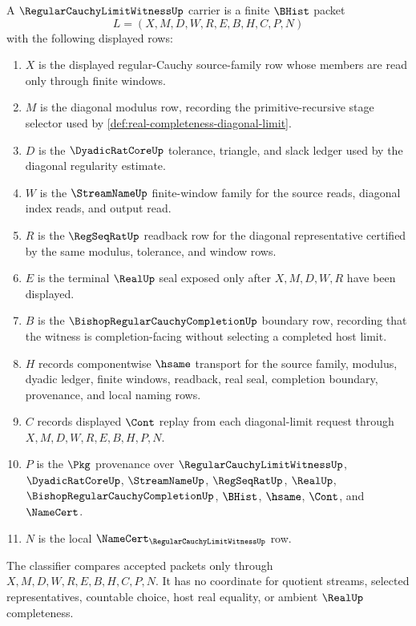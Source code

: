 \begin{definition}
\label{def:regular-cauchy-limit-witness-carrier}
A $\RegularCauchyLimitWitnessUp$ carrier is a finite $\BHist$ packet
$$
L=(X,M,D,W,R,E,B,H,C,P,N)
$$
with the following displayed rows:
\begin{enumerate}
\item $X$ is the displayed regular-Cauchy source-family row whose members are read only through finite windows.
\item $M$ is the diagonal modulus row, recording the primitive-recursive stage selector used by \autoref{def:real-completeness-diagonal-limit}.
\item $D$ is the $\DyadicRatCoreUp$ tolerance, triangle, and slack ledger used by the diagonal regularity estimate.
\item $W$ is the $\StreamNameUp$ finite-window family for the source reads, diagonal index reads, and output read.
\item $R$ is the $\RegSeqRatUp$ readback row for the diagonal representative certified by the same modulus, tolerance, and window rows.
\item $E$ is the terminal $\RealUp$ seal exposed only after $X,M,D,W,R$ have been displayed.
\item $B$ is the $\BishopRegularCauchyCompletionUp$ boundary row, recording that the witness is completion-facing without selecting a completed host limit.
\item $H$ records componentwise $\hsame$ transport for the source family, modulus, dyadic ledger, finite windows, readback, real seal, completion boundary, provenance, and local naming rows.
\item $C$ records displayed $\Cont$ replay from each diagonal-limit request through $X,M,D,W,R,E,B,H,P,N$.
\item $P$ is the $\Pkg$ provenance over $\RegularCauchyLimitWitnessUp$, $\DyadicRatCoreUp$, $\StreamNameUp$, $\RegSeqRatUp$, $\RealUp$, $\BishopRegularCauchyCompletionUp$, $\BHist$, $\hsame$, $\Cont$, and $\NameCert$.
\item $N$ is the local $\NameCert_{\RegularCauchyLimitWitnessUp}$ row.
\end{enumerate}
The classifier compares accepted packets only through $X,M,D,W,R,E,B,H,C,P,N$. It has no coordinate for quotient streams, selected representatives, countable choice, host real equality, or ambient $\RealUp$ completeness.
\end{definition}

